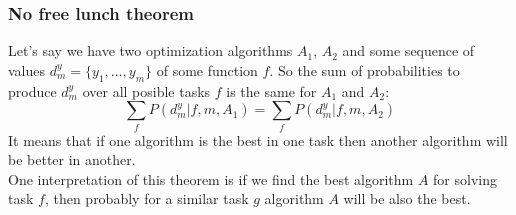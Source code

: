 \subsubsection*{No free lunch theorem}

Let's say we have two optimization algorithms $A_1$, $A_2$ and some sequence of values $d_m^y=\{y_1,\ldots,y_m\}$ of some function $f$. So the sum of probabilities to produce $d_m^y$ over all posible tasks $f$ is the same for $A_1$ and $A_2$:
$$\sum\limits_{f}P(d_m^y|f,m,A_1)=\sum\limits_{f}P(d_m^y|f,m,A_2)$$
It means that if one algorithm is the best in one task then another algorithm will be better in another.\\
One interpretation of this theorem is if we find the best algorithm $A$ for solving task $f$, then probably for a similar task $g$ algorithm $A$ will be also the best.